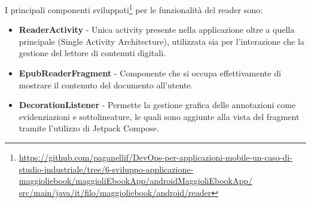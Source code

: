 I principali componenti sviluppati\footnote{\href{https://github.com/paganellif/DevOps-per-applicazioni-mobile-un-caso-di-studio-industriale/tree/6-sviluppo-applicazione-maggioliebook/maggioliEbookApp/androidMaggioliEbookApp/src/main/java/it/filo/maggioliebook/android/reader}{https://github.com/paganellif/DevOps-per-applicazioni-mobile-un-caso-di-studio-industriale/tree/6-sviluppo-applicazione-maggioliebook/maggioliEbookApp/androidMaggioliEbookApp/\\src/main/java/it/filo/maggioliebook/android/reader}} per le funzionalità del reader sono:

\begin{itemize}
    \item \textbf{ReaderActivity} - Unica activity presente nella applicazione oltre a quella principale (Single Activity Architecture), utilizzata sia per l’interazione che la gestione del lettore di contenuti digitali.
    \item \textbf{EpubReaderFragment} - Componente che si occupa effettivamente di mostrare il contenuto del documento all'utente.
    \item \textbf{DecorationListener} - Permette la gestione grafica delle annotazioni come evidenziazioni e sottolineature, le quali sono aggiunte alla vista del fragment tramite l'utilizzo di Jetpack Compose.
\end{itemize}

